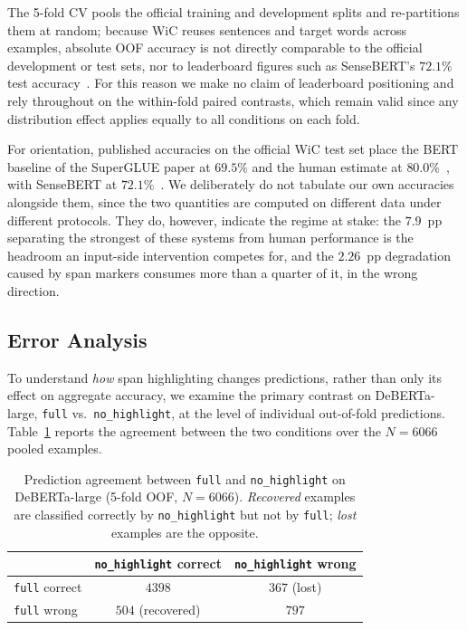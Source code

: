 \documentclass[runningheads]{llncs}
\begin{document}
The 5-fold CV pools the official training and development splits and
re-partitions them at random; because WiC reuses sentences and target words
across examples, absolute OOF accuracy is not directly comparable to the
official development or test sets, nor to leaderboard figures such as
SenseBERT's $72.1\%$ test accuracy~\cite{levine2020sensebert}. For this reason we
make no claim of leaderboard positioning and rely throughout on the within-fold
paired contrasts, which remain valid since any distribution effect applies
equally to all conditions on each fold.

For orientation, published accuracies on the official WiC test set place the
BERT baseline of the SuperGLUE paper at $69.5\%$ and the human estimate at
$80.0\%$~\cite{wang2019superglue}, with SenseBERT at
$72.1\%$~\cite{levine2020sensebert}. We deliberately do not tabulate our own
accuracies alongside them, since the two quantities are computed on different
data under different protocols. They do, however, indicate the regime at stake:
the $7.9$~pp separating the strongest of these systems from human performance is
the headroom an input-side intervention competes for, and the $2.26$~pp
degradation caused by span markers consumes more than a quarter of it, in the
wrong direction.

\subsection{Error Analysis}
\label{subsec:error}

To understand \emph{how} span highlighting changes predictions, rather than only
its effect on aggregate accuracy, we examine the primary contrast on
DeBERTa-large, \texttt{full} vs.\ \texttt{no\_highlight}, at the level of
individual out-of-fold predictions. Table~\ref{tab:agreement} reports the
agreement between the two conditions over the $N = 6066$ pooled examples.

\begin{table}[t]
\centering
\caption{Prediction agreement between \texttt{full} and \texttt{no\_highlight}
on DeBERTa-large (5-fold OOF, $N = 6066$). \emph{Recovered} examples are
classified correctly by \texttt{no\_highlight} but not by \texttt{full};
\emph{lost} examples are the opposite.}
\label{tab:agreement}
\begin{tabular}{lcc}
\toprule
 & \texttt{no\_highlight} correct & \texttt{no\_highlight} wrong\\
\midrule
\texttt{full} correct & $4398$ & $367$ \;(lost)\\
\texttt{full} wrong   & $504$ \;(recovered) & $797$\\
\bottomrule
\end{tabular}
\end{table}
\end{document}
